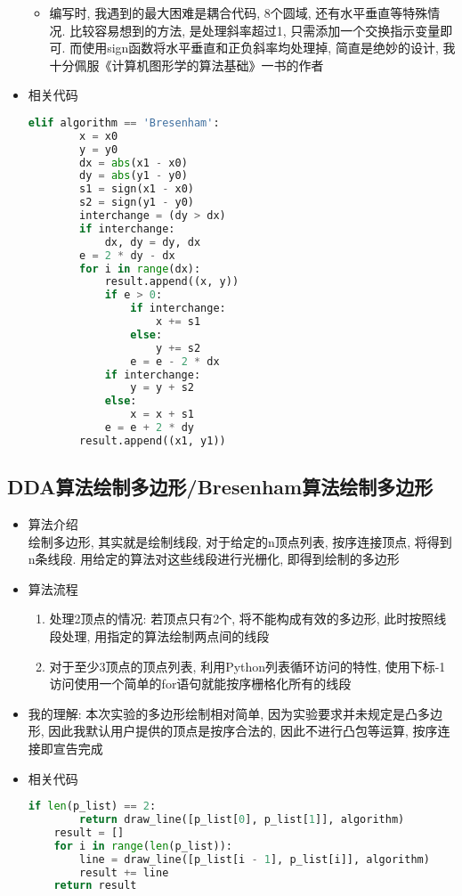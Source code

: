 \documentclass[a4paper,UTF8]{article}
\theoremstyle{definition}
\begin{document}
\begin{itemize}
\begin{itemize}
    \item 编写时, 我遇到的最大困难是耦合代码, 8个圆域, 还有水平垂直等特殊情况. 比较容易想到的方法, 是处理斜率超过1, 只需添加一个交换指示变量即可. 而使用sign函数将水平垂直和正负斜率均处理掉\cite{rog_2002}, 简直是绝妙的设计, 我十分佩服《计算机图形学的算法基础》一书的作者
  \end{itemize}
  \item 相关代码
  \begin{lstlisting}[language={Python}]     
    elif algorithm == 'Bresenham':
        x = x0
        y = y0
        dx = abs(x1 - x0)
        dy = abs(y1 - y0)
        s1 = sign(x1 - x0)
        s2 = sign(y1 - y0)
        interchange = (dy > dx)
        if interchange:
            dx, dy = dy, dx
        e = 2 * dy - dx
        for i in range(dx):
            result.append((x, y))
            if e > 0:
                if interchange:
                    x += s1
                else:
                    y += s2
                e = e - 2 * dx
            if interchange:
                y = y + s2
            else:
                x = x + s1
            e = e + 2 * dy
        result.append((x1, y1))\end{lstlisting}
\end{itemize}
\subsection{DDA算法绘制多边形/Bresenham算法绘制多边形}
\begin{itemize}
  \item 算法介绍\\
  绘制多边形, 其实就是绘制线段, 对于给定的n顶点列表, 按序连接顶点, 将得到n条线段. 用给定的算法对这些线段进行光栅化, 即得到绘制的多边形
  \item 算法流程
  \begin{enumerate}
    \item 处理2顶点的情况: 若顶点只有2个, 将不能构成有效的多边形, 此时按照线段处理, 用指定的算法绘制两点间的线段
    \item 对于至少3顶点的顶点列表, 利用Python列表循环访问的特性, 使用下标-1访问使用一个简单的for语句就能按序栅格化所有的线段
  \end{enumerate}
  \item 我的理解: 本次实验的多边形绘制相对简单, 因为实验要求并未规定是凸多边形, 因此我默认用户提供的顶点是按序合法的, 因此不进行凸包等运算, 按序连接即宣告完成
  \item 相关代码
  \begin{lstlisting}[language={Python}] 
    if len(p_list) == 2:
        return draw_line([p_list[0], p_list[1]], algorithm)
    result = []
    for i in range(len(p_list)):
        line = draw_line([p_list[i - 1], p_list[i]], algorithm)
        result += line
    return result\end{lstlisting}
\end{itemize}
\end{document}
